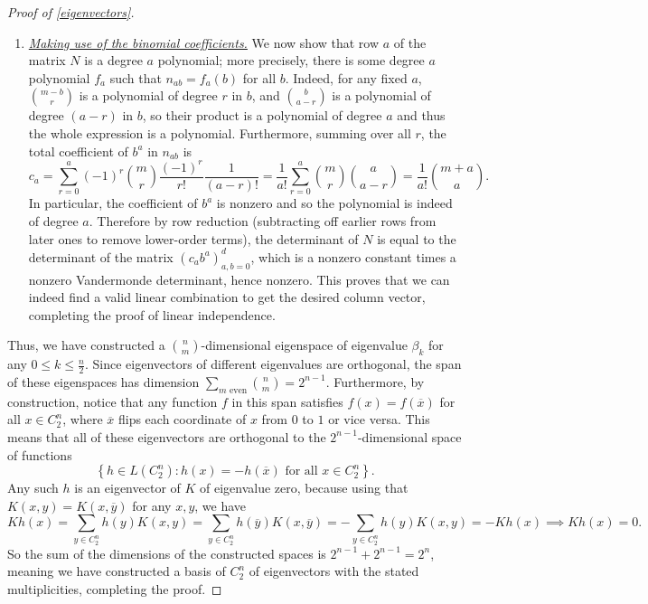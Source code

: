 \documentclass[11pt]{article}
\newcommand{\mc}{\mathcal}
\newcounter{r}
\newcounter{s}
\numberwithin{equation}{section}
\begin{document}
\begin{proof}[Proof of \cref{eigenvectors}]
\begin{enumerate}
    Therefore, each of $\mathbf{v}_0, \cdots, \mathbf{v}_d$ is encoded by its $(d+1)$ values on $\mc{S}_0, \cdots, \mc{S}_d$, and we would like to show that some linear combination of $\mathbf{v}_0, \cdots, \mathbf{v}_d$ yields $1$ on $\mc{S}_0 = \{\{1, \cdots, m\}\}$ and $0$ on all other $\mc{S}_j$s. To do this, it suffices to prove that the $(d+1) \times (d+1)$ matrix 
    \[
        N = (n_{ab})_{a,b=0}^d, \quad n_{ab} = \sum_{r = 0}^a (-1)^r \binom{m}{r} \binom{m-b}{r} \binom{b}{a-r}
    \]
    is invertible.
    \item \textit{\underline{Making use of the binomial coefficients.}} We now show that row $a$ of the matrix $N$ is a degree $a$ polynomial; more precisely, there is some degree $a$ polynomial $f_a$ such that $n_{ab} = f_a(b)$ for all $b$. Indeed, for any fixed $a$, $\binom{m-b}{r}$ is a polynomial of degree $r$ in $b$, and $\binom{b}{a-r}$ is a polynomial of degree $(a-r)$ in $b$, so their product is a polynomial of degree $a$ and thus the whole expression is a polynomial. Furthermore, summing over all $r$, the total coefficient of $b^a$ in $n_{ab}$ is
    \[
        c_a = \sum_{r =0}^a (-1)^r \binom{m}{r} \frac{(-1)^r}{r!} \frac{1}{(a-r)!} = \frac{1}{a!} \sum_{r =0}^a \binom{m}{r} \binom{a}{a-r} = \frac{1}{a!} \binom{m+a}{a}.
    \]
    In particular, the coefficient of $b^a$ is nonzero and so the polynomial is indeed of degree $a$. Therefore by row reduction (subtracting off earlier rows from later ones to remove lower-order terms), the determinant of $N$ is equal to the determinant of the matrix $(c_a b^a)_{a, b = 0}^d$, which is a nonzero constant times a nonzero Vandermonde determinant, hence nonzero. This proves that we can indeed find a valid linear combination to get the desired column vector, completing the proof of linear independence.
\end{enumerate}

Thus, we have constructed a $\binom{n}{m}$-dimensional eigenspace of eigenvalue $\beta_k$ for any $0 \le k \le \frac{n}{2}$. Since eigenvectors of different eigenvalues are orthogonal, the span of these eigenspaces has dimension $\sum_{m\text{ even}} \binom{n}{m} = 2^{n-1}$. Furthermore, by construction, notice that any function $f$ in this span satisfies $f(x) = f(\overline{x})$ for all $x \in C_2^n$, where $\overline{x}$ flips each coordinate of $x$ from $0$ to $1$ or vice versa. This means that all of these eigenvectors are orthogonal to the $2^{n-1}$-dimensional space of functions 
\[
    \left\{h \in L(C_2^n): h(x) = -h(\overline{x}) \text{ for all }x \in C_2^n\right\}.
\]
Any such $h$ is an eigenvector of $K$ of eigenvalue zero, because using that $K(x, y) = K(x, \overline{y})$ for any $x, y$, we have
\[
    Kh(x) = \sum_{y \in C_2^n} h(y) K(x, y) = \sum_{y \in C_2^n} h(\overline{y}) K(x, \overline{y}) = -\sum_{y \in C_2^n} h(y) K(x, y) = -Kh(x) \implies Kh(x) = 0.
\]
So the sum of the dimensions of the constructed spaces is $2^{n-1} + 2^{n-1} = 2^n$, meaning we have constructed a basis of $C_2^n$ of eigenvectors with the stated multiplicities, completing the proof.
\end{proof}
\end{document}
